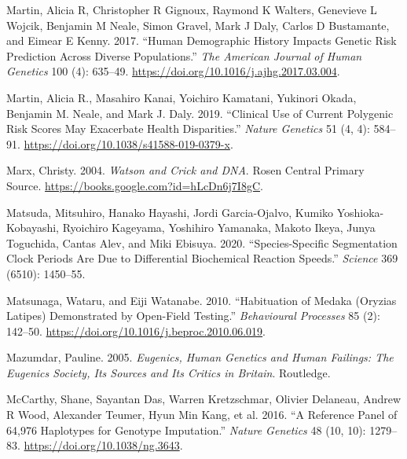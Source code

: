 \documentclass[
]{book}
\newlength{\cslhangindent}
\newlength{\cslentryspacingunit} %
\newenvironment{CSLReferences}[2] %
 {%
  \setlength{\parindent}{0pt}
  \ifodd #1
  \let\oldpar\par
  \def\par{\hangindent=\cslhangindent\oldpar}
  \fi
  \setlength{\parskip}{#2\cslentryspacingunit}
 }%
 {}
\begin{document}
\begin{CSLReferences}{1}{0}
\leavevmode{}%
Martin, Alicia R, Christopher R Gignoux, Raymond K Walters, Genevieve L Wojcik, Benjamin M Neale, Simon Gravel, Mark J Daly, Carlos D Bustamante, and Eimear E Kenny. 2017. {``Human Demographic History Impacts Genetic Risk Prediction Across Diverse Populations.''} \emph{The American Journal of Human Genetics} 100 (4): 635--49. \url{https://doi.org/10.1016/j.ajhg.2017.03.004}.

\leavevmode{}%
Martin, Alicia R., Masahiro Kanai, Yoichiro Kamatani, Yukinori Okada, Benjamin M. Neale, and Mark J. Daly. 2019. {``Clinical Use of Current Polygenic Risk Scores May Exacerbate Health Disparities.''} \emph{Nature Genetics} 51 (4, 4): 584--91. \url{https://doi.org/10.1038/s41588-019-0379-x}.

\leavevmode{}%
Marx, Christy. 2004. \emph{Watson and {Crick} and {DNA}}. {Rosen Central Primary Source}. \url{https://books.google.com?id=hLcDn6j7I8gC}.

\leavevmode{}%
Matsuda, Mitsuhiro, Hanako Hayashi, Jordi Garcia-Ojalvo, Kumiko Yoshioka-Kobayashi, Ryoichiro Kageyama, Yoshihiro Yamanaka, Makoto Ikeya, Junya Toguchida, Cantas Alev, and Miki Ebisuya. 2020. {``Species-Specific Segmentation Clock Periods Are Due to Differential Biochemical Reaction Speeds.''} \emph{Science} 369 (6510): 1450--55.

\leavevmode{}%
Matsunaga, Wataru, and Eiji Watanabe. 2010. {``Habituation of Medaka ({Oryzias} Latipes) Demonstrated by Open-Field Testing.''} \emph{Behavioural Processes} 85 (2): 142--50. \url{https://doi.org/10.1016/j.beproc.2010.06.019}.

\leavevmode{}%
Mazumdar, Pauline. 2005. \emph{Eugenics, Human Genetics and Human Failings: The {Eugenics Society}, Its Sources and Its Critics in {Britain}}. {Routledge}.

\leavevmode{}%
McCarthy, Shane, Sayantan Das, Warren Kretzschmar, Olivier Delaneau, Andrew R Wood, Alexander Teumer, Hyun Min Kang, et al. 2016. {``A Reference Panel of 64,976 Haplotypes for Genotype Imputation.''} \emph{Nature Genetics} 48 (10, 10): 1279--83. \url{https://doi.org/10.1038/ng.3643}.


\end{CSLReferences}
\end{document}
